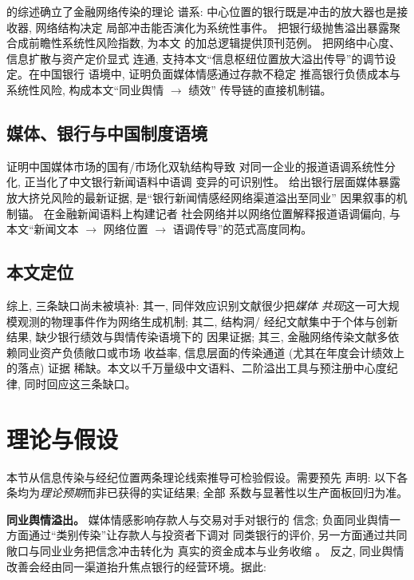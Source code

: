 \textcite{jackson2021systemic} 的综述确立了金融网络传染的理论
谱系: 中心位置的银行既是冲击的放大器也是接收器, 网络结构决定
局部冲击能否演化为系统性事件。\textcite{duarte2021firesale}
把银行级抛售溢出暴露聚合成前瞻性系统性风险指数, 为本文
 的加总逻辑提供顶刊范例。
\textcite{yu2024centrality} 把网络中心度、信息扩散与资产定价显式
连通, 支持本文``信息枢纽位置放大溢出传导''的调节设定。在中国银行
语境中, \textcite{fang2024media} 证明负面媒体情感通过存款不稳定
推高银行负债成本与系统性风险, 构成本文``同业舆情 $\to$ 绩效''
传导链的直接机制锚。

\subsection{媒体、银行与中国制度语境}

\textcite{you2018power} 证明中国媒体市场的国有/市场化双轨结构导致
对同一企业的报道语调系统性分化, 正当化了中文银行新闻语料中语调
变异的可识别性。\textcite{cookson2026social} 给出银行层面媒体暴露
放大挤兑风险的最新证据, 是``银行新闻情感经网络渠道溢出至同业''
因果叙事的机制锚。\textcite{xu2024news} 在金融新闻语料上构建记者
社会网络并以网络位置解释报道语调偏向, 与本文``新闻文本 $\to$
网络位置 $\to$ 语调传导''的范式高度同构。

\subsection{本文定位}

综上, 三条缺口尚未被填补: 其一, 同伴效应识别文献很少把\emph{媒体
共现}这一可大规模观测的物理事件作为网络生成机制; 其二, 结构洞/
经纪文献集中于个体与创新结果, 缺少银行绩效与舆情传染语境下的
因果证据; 其三, 金融网络传染文献多依赖同业资产负债敞口或市场
收益率, 信息层面的传染通道 (尤其在年度会计绩效上的落点) 证据
稀缺。本文以千万量级中文语料、二阶溢出工具与预注册中心度纪律,
同时回应这三条缺口。

\section{理论与假设}\label{sec:theory}

本节从信息传染与经纪位置两条理论线索推导可检验假设。需要预先
声明: 以下各条均为\emph{理论预期}而非已获得的实证结果; 全部
系数与显著性以生产面板回归为准。

\textbf{同业舆情溢出。} 媒体情感影响存款人与交易对手对银行的
信念; 负面同业舆情一方面通过``类别传染''让存款人与投资者下调对
同类银行的评价, 另一方面通过共同敞口与同业业务把信念冲击转化为
真实的资金成本与业务收缩 \parencite{fang2024media,jackson2021systemic}。
反之, 同业舆情改善会经由同一渠道抬升焦点银行的经营环境。据此:


